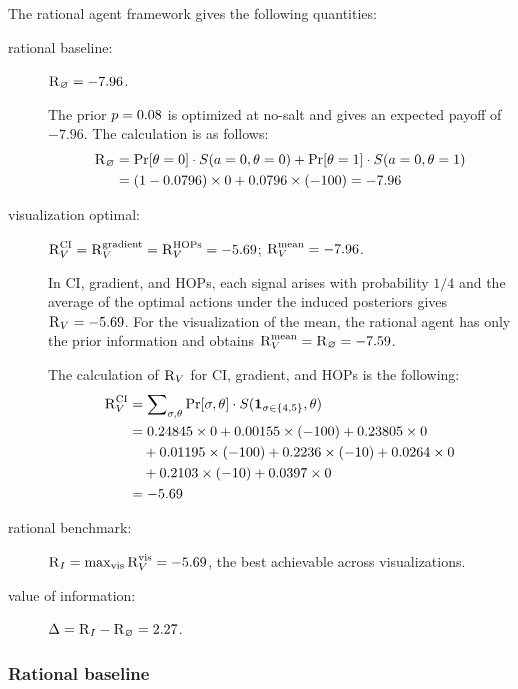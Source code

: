 \documentclass{article}
\begin{document}
The rational agent framework gives the following quantities:
\begin{description}
\item[rational baseline:] $\textsc{R}_{\varnothing} = -7.96$.  

  The prior $p = 0.08$ is optimized at no-salt and gives an expected payoff of $-7.96$. The calculation is as follows:
\begin{align*}
    \textsc{R}_{\varnothing} &= \Pr[\theta=0]\cdot S(a = 0, \theta=0) + \Pr[\theta=1]\cdot S(a = 0, \theta=1)\\
    &= (1-0.0796)\times 0 + 0.0796\times (-100)=-7.96
\end{align*}
  

\item[visualization optimal:] 
  $\textsc{R}_V^{\text{CI}}=\textsc{R}_V^{\text{gradient}}=\textsc{R}_V^{\text{HOPs}}=-5.69$; $\textsc{R}_V^{\text{mean}}=-7.96$.
  
  In CI, gradient, and HOPs, each signal arises with probability $1/4$ and the average of the optimal actions under the induced posteriors gives $\textsc{R}_V = -5.69$.  For the visualization of the mean, the rational agent has only the prior information and obtains $\textsc{R}_V^{\text{mean}} = \textsc{R}_{\varnothing} = -7.59$.

  The calculation of $\textsc{R}_V$ for CI, gradient, and HOPs is the following:
  \begin{align*}
      \textsc{R}_V^{\text{CI}} &= \sum\nolimits_{\sigma, \theta}\Pr[\sigma, \theta]\cdot S(\mathbf{1}_{\sigma\in\{4, 5\}}, \theta)\\
      &= 0.24845\times 0 + 0.00155\times (-100)+0.23805\times 0 \\
      &\quad+ 0.01195\times (-100) + 0.2236\times (-10) + 0.0264\times 0\\
      &\quad + 0.2103\times (-10) + 0.0397\times 0\\
      &= -5.69
  \end{align*}
 \item[rational benchmark:] $\textsc{R}_I = \max_{\text{vis}} \textsc{R}_V^{\text{vis}} = -5.69$, the best achievable across visualizations. 
\item[value of information:]  $\Delta = \textsc{R}_I - \textsc{R}_{\varnothing} = 2.27$.%

  \end{description}

\subsubsection{Rational baseline}
\end{document}
